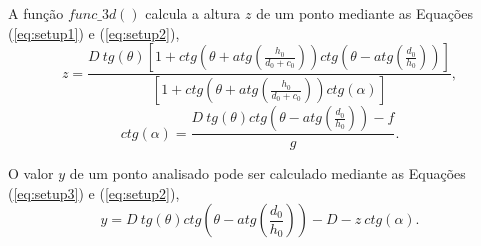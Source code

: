 \documentclass[a4paper, 12pt]{article}
\begin{document}
A função $func\_3d()$ calcula a altura $z$ de um ponto mediante as
Equações (\ref{eq:setup1}) e (\ref{eq:setup2}),
\begin{equation}\label{eq:setup1}
z=\frac{
D~tg(\theta)
\left[
1+ ctg\left(\theta+atg\left(\frac{h_0}{d_0+c_0}\right)\right) ctg\left(\theta-atg\left(\frac{d_0}{h_0}\right)\right) 
\right]
}{
\left[1+ctg\left(\theta+atg\left(\frac{h_0}{d_0+c_0}\right)\right) ctg(\alpha)\right]
},
\end{equation}
\begin{equation}\label{eq:setup2}
ctg(\alpha)=\frac{D~tg(\theta)ctg\left(\theta-atg\left(\frac{d_0}{h_0}\right)\right)- f}{g}.
\end{equation}

O valor $y$ de um ponto analisado pode ser calculado mediante as
Equações (\ref{eq:setup3}) e (\ref{eq:setup2}),
\begin{equation}\label{eq:setup3}
y=D~tg(\theta)ctg\left(\theta-atg\left(\frac{d_0}{h_0}\right)\right)-D-z~ctg(\alpha).
\end{equation}
\end{document}
